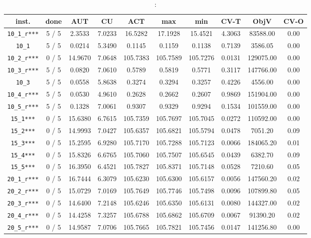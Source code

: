 \documentclass{scrartcl}
\begin{document}
\begin{table}[h!]
\begin{center}
\small
\begin{tabular}{| c | c | c | c | c | c | c | c | c | c |}
\hline
inst. & done & AUT & CU & ACT & max & min & CV-T & ObjV & CV-O \\
\hline
\verb|10_1_r***| & 5 / 5 & 2.3533 & 7.0233 & 16.5282 & 17.1928 & 15.4521 & 4.3063 & 83588.00 & 0.00\\ 
\verb|10_1| & 5 / 5 & 0.0214 & 5.3490 & 0.1145 & 0.1159 & 0.1138 & 0.7139 & 3586.05 & 0.00\\ 
\verb|10_2_r***| & 0 / 5 & 14.9670 & 7.0648 & 105.7383 & 105.7589 & 105.7276 & 0.0131 & 129075.00 & 0.00\\ 
\verb|10_3_r***| & 5 / 5 & 0.0820 & 7.0610 & 0.5789 & 0.5819 & 0.5771 & 0.3117 & 147766.00 & 0.00\\ 
\verb|10_3| & 5 / 5 & 0.0558 & 5.8638 & 0.3274 & 0.3294 & 0.3257 & 0.4226 & 4556.00 & 0.00\\ 
\verb|10_4_r***| & 5 / 5 & 0.0530 & 4.9610 & 0.2628 & 0.2662 & 0.2607 & 0.9869 & 151904.00 & 0.00\\ 
\verb|10_5_r***| & 5 / 5 & 0.1328 & 7.0061 & 0.9307 & 0.9329 & 0.9294 & 0.1534 & 101559.00 & 0.00\\ 
\verb|15_1***| & 0 / 5 & 15.6380 & 6.7615 & 105.7359 & 105.7697 & 105.7045 & 0.0272 & 110592.00 & 0.00\\ 
\verb|15_2***| & 0 / 5 & 14.9993 & 7.0427 & 105.6357 & 105.6821 & 105.5794 & 0.0478 & 7051.20 & 0.09\\ 
\verb|15_3***| & 0 / 5 & 15.2595 & 6.9280 & 105.7170 & 105.7288 & 105.7123 & 0.0066 & 184065.20 & 0.01\\ 
\verb|15_4***| & 0 / 5 & 15.8326 & 6.6765 & 105.7060 & 105.7507 & 105.6545 & 0.0439 & 6382.70 & 0.09\\ 
\verb|15_5***| & 0 / 5 & 16.3950 & 6.4521 & 105.7827 & 105.8371 & 105.7148 & 0.0528 & 7210.60 & 0.05\\ 
\verb|20_1_r***| & 0 / 5 & 16.7444 & 6.3079 & 105.6230 & 105.6300 & 105.6157 & 0.0056 & 147560.20 & 0.02\\ 
\verb|20_2_r***| & 0 / 5 & 15.0729 & 7.0169 & 105.7649 & 105.7746 & 105.7498 & 0.0096 & 107899.80 & 0.05\\ 
\verb|20_3_r***| & 0 / 5 & 14.6400 & 7.2148 & 105.6246 & 105.6350 & 105.6131 & 0.0080 & 144327.00 & 0.02\\  
\verb|20_4_r***| & 0 / 5 & 14.4258 & 7.3257 & 105.6788 & 105.6862 & 105.6709 & 0.0067 & 91390.20 & 0.02\\ 
\verb|20_5_r***| & 0 / 5 & 14.9587 & 7.0706 & 105.7665 & 105.7821 & 105.7456 & 0.0147 & 141256.80 & 0.00\\ 
\hline
\end{tabular}
\caption{:}
\label{table:}
\end{center}
\end{table}
\end{document}
